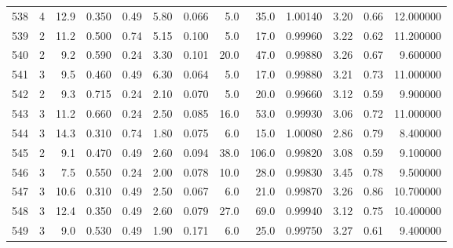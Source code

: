 \begin{tabular}{lrrrrrrrrrrrr}
538  &        4 &           12.9 &             0.350 &         0.49 &            5.80 &      0.066 &                  5.0 &                  35.0 &  1.00140 &  3.20 &       0.66 &  12.000000 \\
539  &        2 &           11.2 &             0.500 &         0.74 &            5.15 &      0.100 &                  5.0 &                  17.0 &  0.99960 &  3.22 &       0.62 &  11.200000 \\
540  &        2 &            9.2 &             0.590 &         0.24 &            3.30 &      0.101 &                 20.0 &                  47.0 &  0.99880 &  3.26 &       0.67 &   9.600000 \\
541  &        3 &            9.5 &             0.460 &         0.49 &            6.30 &      0.064 &                  5.0 &                  17.0 &  0.99880 &  3.21 &       0.73 &  11.000000 \\
542  &        2 &            9.3 &             0.715 &         0.24 &            2.10 &      0.070 &                  5.0 &                  20.0 &  0.99660 &  3.12 &       0.59 &   9.900000 \\
543  &        3 &           11.2 &             0.660 &         0.24 &            2.50 &      0.085 &                 16.0 &                  53.0 &  0.99930 &  3.06 &       0.72 &  11.000000 \\
544  &        3 &           14.3 &             0.310 &         0.74 &            1.80 &      0.075 &                  6.0 &                  15.0 &  1.00080 &  2.86 &       0.79 &   8.400000 \\
545  &        2 &            9.1 &             0.470 &         0.49 &            2.60 &      0.094 &                 38.0 &                 106.0 &  0.99820 &  3.08 &       0.59 &   9.100000 \\
546  &        3 &            7.5 &             0.550 &         0.24 &            2.00 &      0.078 &                 10.0 &                  28.0 &  0.99830 &  3.45 &       0.78 &   9.500000 \\
547  &        3 &           10.6 &             0.310 &         0.49 &            2.50 &      0.067 &                  6.0 &                  21.0 &  0.99870 &  3.26 &       0.86 &  10.700000 \\
548  &        3 &           12.4 &             0.350 &         0.49 &            2.60 &      0.079 &                 27.0 &                  69.0 &  0.99940 &  3.12 &       0.75 &  10.400000 \\
549  &        3 &            9.0 &             0.530 &         0.49 &            1.90 &      0.171 &                  6.0 &                  25.0 &  0.99750 &  3.27 &       0.61 &   9.400000 \\

\end{tabular}
